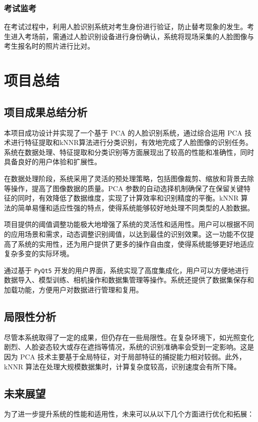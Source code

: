 \documentclass{article}
\begin{document}
\subsubsection{考试监考}
在考试过程中，利用人脸识别系统对考生身份进行验证，防止替考现象的发生。考生进入考场前，需通过人脸识别设备进行身份确认，系统将现场采集的人脸图像与考生报名时的照片进行比对。
\newpage
\section{项目总结}

\subsection{项目成果总结分析}
本项目成功设计并实现了一个基于 PCA 的人脸识别系统，通过综合运用 PCA 技术进行特征提取和kNNR算法进行分类识别，有效地完成了人脸图像的识别任务。系统在数据处理、特征提取和分类识别等方面展现出了较高的性能和准确性，同时具备良好的用户体验和扩展性。

在数据处理阶段，系统采用了灵活的预处理策略，包括图像裁剪、缩放和背景去除等操作，提高了图像数据的质量。PCA 参数的自动选择机制确保了在保留关键特征的同时，有效降低了数据维度，实现了计算效率和识别精度的平衡。kNNR 算法的简单易懂和适应性强的特点，使得系统能够较好地处理不同类型的人脸数据。

项目提供的阈值调整功能极大地增强了系统的灵活性和适用性。用户可以根据不同的应用场景和需求，动态调整识别阈值，以达到最佳的识别效果。这一功能不仅提高了系统的实用性，还为用户提供了更多的操作自由度，使得系统能够更好地适应复杂多变的实际环境。

通过基于 \texttt{PyQt5} 开发的用户界面，系统实现了高度集成化，用户可以方便地进行数据导入、模型训练、相机操作和数据集管理等操作。系统还提供了数据集保存和加载功能，方便用户对数据进行管理和复用。

\subsection{局限性分析}
尽管本系统取得了一定的成果，但仍存在一些局限性。在复杂环境下，如光照变化剧烈、人脸姿态较大或存在遮挡等情况，系统的识别准确率会受到一定影响。这是因为 PCA 技术主要基于全局特征，对于局部特征的捕捉能力相对较弱。此外，kNNR 算法在处理大规模数据集时，计算复杂度较高，识别速度会有所下降。

\subsection{未来展望}
为了进一步提升系统的性能和适用性，未来可以从以下几个方面进行优化和拓展：
\end{document}
